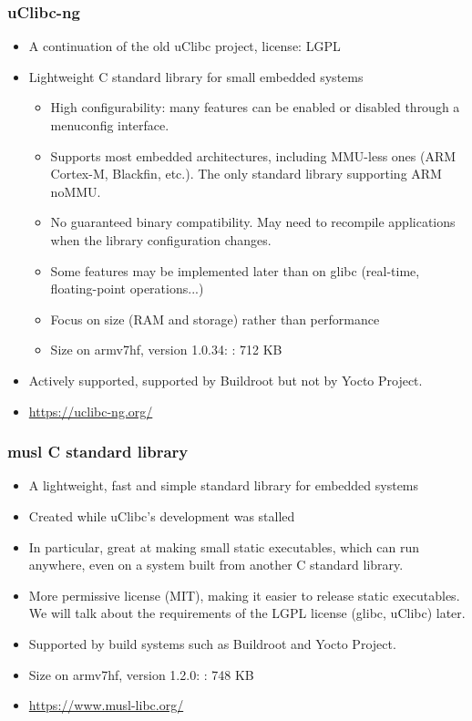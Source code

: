 \begin{frame}
  \frametitle{uClibc-ng}
  \begin{itemize}
  \item A continuation of the old uClibc project, license: LGPL
  \item Lightweight C standard library for small embedded systems
    \begin{itemize}
    \item High configurability: many features can be enabled or
          disabled through a menuconfig interface.
    \item Supports most embedded architectures, including MMU-less
          ones (ARM Cortex-M, Blackfin, etc.). The only standard library
          supporting ARM noMMU.
    \item No guaranteed binary compatibility. May need to
          recompile applications when the library configuration changes.
    \item Some features may be implemented later than on glibc (real-time,
          floating-point operations...)
    \item Focus on size (RAM and storage) rather than performance
    \item Size on armv7hf, version 1.0.34: : 712 KB
    \end{itemize}
  \item Actively supported, supported by Buildroot but not by Yocto Project.
  \item \url{https://uclibc-ng.org/}
  \end{itemize}
\end{frame}

\begin{frame}
  \frametitle{musl C standard library}
    \begin{itemize}
    \item A lightweight, fast and simple standard library for embedded systems
    \item Created while uClibc's development was stalled
    \item In particular, great at making small static executables,
          which can run anywhere, even on a system built
          from another C standard library.
    \item More permissive license (MIT), making it easier to release
          static executables. We will talk about the requirements
          of the LGPL license (glibc, uClibc) later.
    \item Supported by build systems such as Buildroot and Yocto Project.
    \item Size on armv7hf, version 1.2.0: : 748 KB
    \item \url{https://www.musl-libc.org/}
    \end{itemize}
\end{frame}

